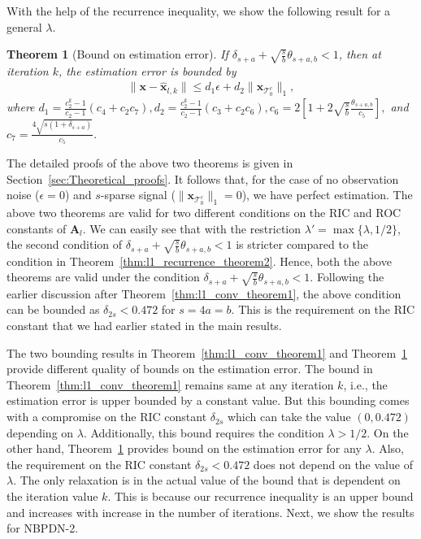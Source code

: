 \documentclass[journal]{IEEEtran}
\newcommand{\mbx}{\mathbf{x}}
\newcommand{\mbA}{\mathbf{A}}
\newcommand{\T}{\mathcal{T}}
\newtheorem{theorem}{Theorem}
\begin{document}
With the help of the recurrence inequality, we show the following result for a general $\lambda$.
\begin{theorem}[Bound on estimation error]
\label{thm:l1_convergence_theorem2}
If $\delta_{s+a}+\sqrt{\frac{s}{b}}\theta_{s+a,b} < 1$, then at iteration $k$, the estimation error is bounded by
\begin{eqnarray*}
\|\mbx-\hat{\mbx}_{l,k}\| \leq d_1 \epsilon + d_2 \|\mbx_{\T_0^c}\|_1,
\end{eqnarray*}
where $d_1 = \frac{c_2^k-1}{c_2-1}(c_4+c_2c_7), d_2 = \frac{c_2^k-1}{c_2-1}(c_3+c_2c_6), c_6 = 2 \left[1 + 2 \sqrt{\frac{s}{b}} \frac{\theta_{s+a,b}}{c_5}\right],$ and $c_7 = \frac{4 \sqrt{s(1+\delta_{s+a})}}{c_5}$.
\end{theorem}
The detailed proofs of the above two theorems is given in Section~\ref{sec:Theoretical_proofs}. It follows that, for the case of no observation noise ($\epsilon=0$) and $s$-sparse signal ($\|\mbx_{\T_0^c}\|_1=0$), we have perfect estimation. The above two theorems are valid for two different conditions on the RIC and ROC constants of $\mbA_l$. We can easily see that with the restriction $\lambda' = \max\{\lambda,1/2\}$, the second condition of $\delta_{s+a}+\sqrt{\frac{s}{b}}\theta_{s+a,b} < 1$ is stricter compared to the condition in Theorem~\ref{thm:l1_recurrence_theorem2}. Hence, both the above theorems are valid under the condition $\delta_{s+a}+\sqrt{\frac{s}{b}}\theta_{s+a,b} < 1$. Following the earlier discussion after Theorem~\ref{thm:l1_conv_theorem1}, the above condition can be bounded as $\delta_{2s} < 0.472$ for $s = 4a = b$. This is the requirement on the RIC constant that we had earlier stated in the main results.

The two bounding results in Theorem~\ref{thm:l1_conv_theorem1} and Theorem~\ref{thm:l1_convergence_theorem2} provide different quality of bounds on the estimation error. The bound in Theorem~\ref{thm:l1_conv_theorem1} remains same at any iteration $k$, i.e., the estimation error is upper bounded by a constant value. But this bounding comes with a compromise on the RIC constant $\delta_{2s}$ which can take the value $(0,0.472)$ depending on $\lambda$. Additionally, this bound requires the condition $\lambda > 1/2$. On the other hand, Theorem~\ref{thm:l1_convergence_theorem2} provides bound on the estimation error for any $\lambda$. Also, the requirement on the RIC constant $\delta_{2s}<0.472$ does not depend on the value of $\lambda$. The only relaxation is in the actual value of the bound that is dependent on the iteration value $k$. This is because our recurrence inequality is an upper bound and increases with increase in the number of iterations. Next, we show the results for NBPDN-2.
\end{document}
